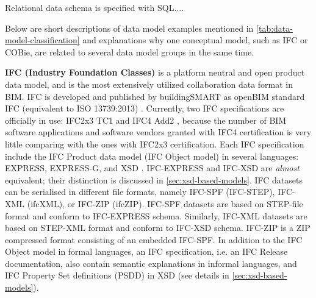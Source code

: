 Relational data schema is specified with SQL....



Below are short descriptions of data model examples mentioned in \autoref{tab:data-model-classification} and explanations why one conceptual model, such as IFC or COBie, are related to several data model groups in the same time.


\textbf{IFC (Industry Foundation Classes)} is a platform neutral and open product data model, and is the most extensively utilized collaboration data format in BIM.
IFC is developed and published by buildingSMART as openBIM standard IFC (equivalent to ISO 13739:2013) \cite{iso2013ifc}.
Currently, two IFC specifications are officially in use: IFC2x3 TC1 \cite{liebich2007ifc2x3} and IFC4 Add2 \cite{liebich2016ifc4}, because the number of BIM software applications and software vendors granted with IFC4 certification is very little comparing with the ones with IFC2x3 certification.
Each IFC specification include the IFC Product data model (IFC Object model) in several languages: EXPRESS, EXPRESS-G, and XSD \cite{liebich2007ifc2x3, liebich2016ifc4}.
IFC-EXPRESS and IFC-XSD are \emph{almost} equivalent; their distinction is discussed in \autoref{sec:xsd-based-models}.
IFC datasets can be serialised in different file formats, namely IFC-SPF (IFC-STEP), IFC-XML (ifcXML), or IFC-ZIP (ifcZIP).
IFC-SPF datasets are based on STEP-file format and conform to IFC-EXPRESS schema.
Similarly, IFC-XML datasets are based on STEP-XML format and conform to IFC-XSD schema.
IFC-ZIP is a ZIP compressed format consisting of an embedded IFC-SPF.
In addition to the IFC Object model in formal languages, an IFC specification, i.e. an IFC Release documentation, also contain semantic explanations in informal languages, and IFC Property Set definitions (PSDD) in XSD (see details in \ref{sec:xsd-based-models}).


